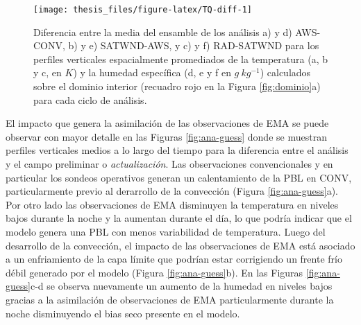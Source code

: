 \documentclass[12pt,oneside]{reedthesis}
\begin{document}
\begin{figure}

{\centering \texttt{[image: thesis\_files/figure-latex/TQ-diff-1]} 

}

\caption{Diferencia entre la media del ensamble de los análisis a) y d) AWS-CONV, b) y e) SATWND-AWS, y c) y f) RAD-SATWND para los perfiles verticales espacialmente promediados de la temperatura (a, b y c, en \(K\)) y la humedad específica (d, e y f en \(g\ kg^{-1}\)) calculados sobre el dominio interior (recuadro rojo en la Figura \ref{fig:dominio}a) para cada ciclo de análisis.}\label{fig:TQ-diff}
\end{figure}
El impacto que genera la asimilación de las observaciones de EMA se puede observar con mayor detalle en las Figuras \ref{fig:ana-guess} donde se muestran perfiles verticales medios a lo largo del tiempo para la diferencia entre el análisis y el campo preliminar o \emph{actualización}. Las observaciones convencionales y en particular los sondeos operativos generan un calentamiento de la PBL en CONV, particularmente previo al derarrollo de la convección (Figura \ref{fig:ana-guess}a). Por otro lado las observaciones de EMA disminuyen la temperatura en niveles bajos durante la noche y la aumentan durante el día, lo que podría indicar que el modelo genera una PBL con menos variabilidad de temperatura. Luego del desarrollo de la convección, el impacto de las observaciones de EMA está asociado a un enfriamiento de la capa límite que podrían estar corrigiendo un frente frío débil generado por el modelo (Figura \ref{fig:ana-guess}b). En las Figuras \ref{fig:ana-guess}c-d se observa nuevamente un aumento de la humedad en niveles bajos gracias a la asimilación de observaciones de EMA particularmente durante la noche disminuyendo el bias seco presente en el modelo.
\end{document}

